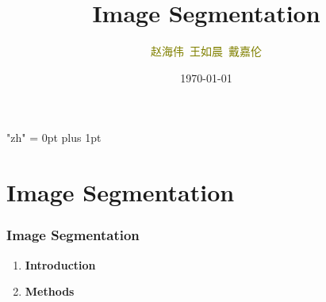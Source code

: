 \documentclass[notheorems,mathserif,table,compress]{beamer}  %
\begin{document}
\XeTeXlinebreaklocale "zh"         %
\XeTeXlinebreakskip = 0pt plus 1pt %

\title[Image Segmentation]{Image Segmentation}
\author[赵海伟\ 王如晨\ 戴嘉伦 ]{\textcolor{olive}{赵海伟\ 王如晨\  戴嘉伦 }}
\institute[CVBIOUC]{\small\textcolor{violet}{CVBIOUC}}
\date{\today}
\frame{ \titlepage }

\section{Image Segmentation}
\begin{frame}
   \frametitle{Image Segmentation}
   \begin{enumerate}
   \item  {\textbf{\Large Introduction}}\newline
    \item {\textbf{\Large Methods}} 
    \end{enumerate}
\end{frame}
\end{document}
